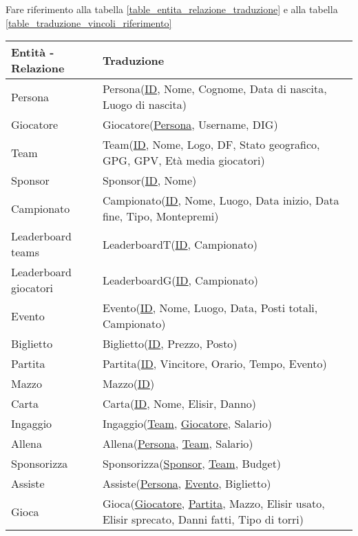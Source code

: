 \documentclass{article}
\begin{document}
Fare riferimento alla tabella \ref{table_entita_relazione_traduzione} e alla tabella \ref{table_traduzione_vincoli_riferimento}

\begin{table}
    \centering
    \begin{tabularx}{\textwidth}{|l|X|}
        \hline
        \textbf{Entità - Relazione} & \textbf{Traduzione} \\ \hline
        Persona & Persona(\underline{ID}, Nome, Cognome, Data di nascita, Luogo di nascita) \\ \hline
        Giocatore & Giocatore(\underline{Persona}, Username, DIG) \\ \hline
        Team & Team(\underline{ID}, Nome, Logo, DF, Stato geografico, GPG, GPV, Età media giocatori) \\ \hline
        Sponsor & Sponsor(\underline{ID}, Nome) \\ \hline
        Campionato & Campionato(\underline{ID}, Nome, Luogo, Data inizio, Data fine, Tipo, Montepremi) \\ \hline
        Leaderboard teams & LeaderboardT(\underline{ID}, Campionato)  \\ \hline
        Leaderboard giocatori & LeaderboardG(\underline{ID}, Campionato) \\ \hline
        Evento & Evento(\underline{ID}, Nome, Luogo, Data, Posti totali, Campionato) \\ \hline
        Biglietto & Biglietto(\underline{ID}, Prezzo, Posto) \\ \hline
        Partita & Partita(\underline{ID}, Vincitore, Orario, Tempo, Evento) \\ \hline
        Mazzo & Mazzo(\underline{ID}) \\ \hline %
        Carta & Carta(\underline{ID}, Nome, Elisir, Danno) \\ \hline
        Ingaggio & Ingaggio(\underline{Team}, \underline{Giocatore}, Salario) \\ \hline
        Allena & Allena(\underline{Persona}, \underline{Team}, Salario) \\ \hline
        Sponsorizza & Sponsorizza(\underline{Sponsor}, \underline{Team}, Budget) \\ \hline
        Assiste & Assiste(\underline{Persona}, \underline{Evento}, Biglietto) \\ \hline
        Gioca & Gioca(\underline{Giocatore}, \underline{Partita}, Mazzo, Elisir usato, Elisir sprecato, Danni fatti, Tipo di torri) \\ \hline

\end{tabularx}
\end{table}
\end{document}
